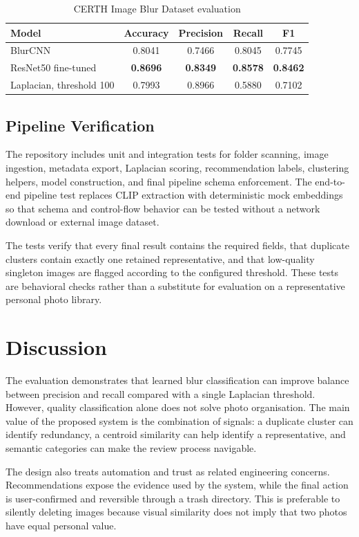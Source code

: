 \documentclass[conference]{IEEEtran}
\begin{document}
\begin{table}[htbp]
\caption{CERTH Image Blur Dataset evaluation}
\label{tab:blur-results}
\centering
\begin{tabular}{lcccc}
\hline
\textbf{Model} & \textbf{Accuracy} & \textbf{Precision} & \textbf{Recall} & \textbf{F1} \\
\hline
BlurCNN & 0.8041 & 0.7466 & 0.8045 & 0.7745 \\
ResNet50 fine-tuned & \textbf{0.8696} & \textbf{0.8349} & \textbf{0.8578} & \textbf{0.8462} \\
Laplacian, threshold 100 & 0.7993 & 0.8966 & 0.5880 & 0.7102 \\
\hline
\end{tabular}
\end{table}

\subsection{Pipeline Verification}
The repository includes unit and integration tests for folder scanning, image ingestion, metadata export, Laplacian scoring, recommendation labels, clustering helpers, model construction, and final pipeline schema enforcement. The end-to-end pipeline test replaces CLIP extraction with deterministic mock embeddings so that schema and control-flow behavior can be tested without a network download or external image dataset.

The tests verify that every final result contains the required fields, that duplicate clusters contain exactly one retained representative, and that low-quality singleton images are flagged according to the configured threshold. These tests are behavioral checks rather than a substitute for evaluation on a representative personal photo library.

\section{Discussion}
The evaluation demonstrates that learned blur classification can improve balance between precision and recall compared with a single Laplacian threshold. However, quality classification alone does not solve photo organisation. The main value of the proposed system is the combination of signals: a duplicate cluster can identify redundancy, a centroid similarity can help identify a representative, and semantic categories can make the review process navigable.

The design also treats automation and trust as related engineering concerns. Recommendations expose the evidence used by the system, while the final action is user-confirmed and reversible through a trash directory. This is preferable to silently deleting images because visual similarity does not imply that two photos have equal personal value.
\end{document}
